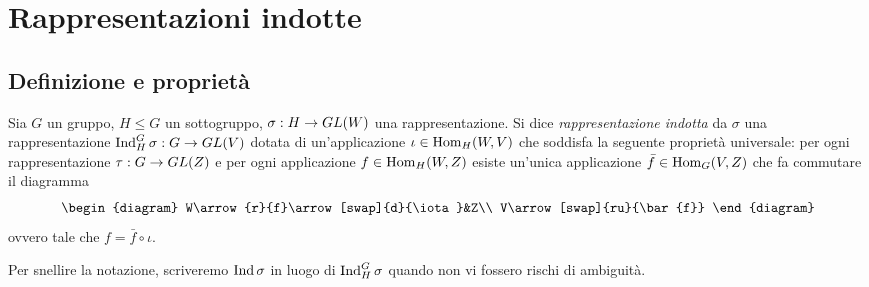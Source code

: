 \chapter{Rappresentazioni indotte}

\section{Definizione e proprietà}

\begin{definition}
Sia $G$ un gruppo, $H\le G$ un sottogruppo, $\sigma:H\to GL(W)$ una rappresentazione. Si dice \emph{rappresentazione indotta} da $\sigma$ una rappresentazione $\operatorname{Ind}_H^G\sigma:G\to GL(V)$ dotata di un'applicazione $\iota\in\operatorname{Hom}_H(W,V)$ che soddisfa la seguente proprietà universale: per ogni rappresentazione $\tau:G\to GL(Z)$ e per ogni applicazione $f\in\operatorname{Hom}_H(W,Z)$ esiste un'unica applicazione $\bar{f}\in\operatorname{Hom}_G(V,Z)$ che fa commutare il diagramma
$$
\begin{diagram}
W\arrow{r}{f}\arrow[swap]{d}{\iota}&Z\\
V\arrow[swap]{ru}{\bar{f}}
\end{diagram}
$$
ovvero tale che $f=\bar{f}\circ\iota$.
\end{definition}

Per snellire la notazione, scriveremo $\operatorname{Ind}\sigma$ in luogo di $\operatorname{Ind}_H^G\sigma$ quando non vi fossero rischi di ambiguità.

